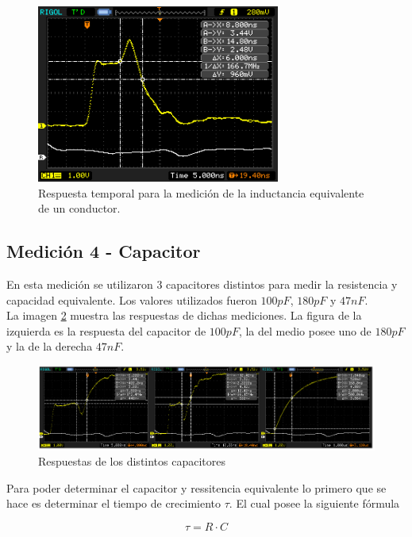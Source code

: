 \documentclass[a4paper,10pt]{article}
\begin{document}
		\begin{figure}[!htb]
			\centering
			\includegraphics[width=8cm]
			{Imagenes/CORTO.png}
			\caption{Respuesta temporal para la medici\'on de la inductancia 
			equivalente de un conductor.}
			\label{img008}
		\end{figure}
		
	\subsection{Medición 4 - Capacitor}
	\indent En esta medición se utilizaron 3 capacitores distintos para medir
	la resistencia y capacidad equivalente. Los valores utilizados fueron 
	$100pF$, $180pF$ y $47nF$. \\
	\indent La imagen \ref{img010} muestra las respuestas de dichas 
	mediciones. La figura de la izquierda es la respuesta del capacitor de 
	$100pF$, la del medio posee uno de $180pF$ y la de la derecha $47nF$. \\
	
		\begin{figure}[!htb]
			\centering
			\includegraphics[width=12cm]
			{Imagenes/CurvasCapacitor.png}
			\caption{Respuestas de los distintos capacitores}
			\label{img010} 
		\end{figure}

	\indent Para poder determinar el capacitor y ressitencia equivalente lo 
	primero que se hace es determinar el tiempo de crecimiento $\tau$. El cual
	posee la siguiente fórmula

		\begin{equation}
			\tau = R\cdot C
		\end{equation}
	
\end{document}
